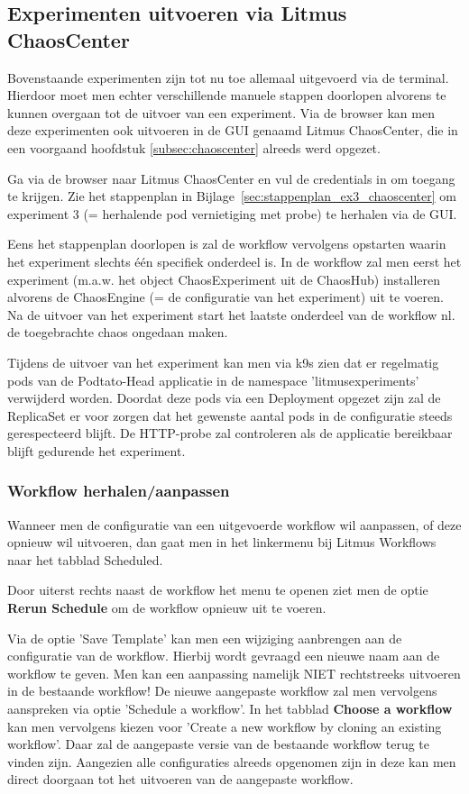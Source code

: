 \subsection{Experimenten uitvoeren via Litmus ChaosCenter}
\label{subsec:expchaoscenter}

Bovenstaande experimenten zijn tot nu toe allemaal uitgevoerd via de terminal. Hierdoor moet men echter verschillende manuele stappen doorlopen alvorens te kunnen overgaan tot de uitvoer van een experiment. Via de browser kan men deze experimenten ook uitvoeren in de GUI genaamd Litmus ChaosCenter, die in een voorgaand hoofdstuk \ref{subsec:chaoscenter} alreeds werd opgezet. 

Ga via de browser naar Litmus ChaosCenter en vul de credentials in om toegang te krijgen. Zie het  stappenplan in Bijlage~\ref{sec:stappenplan_ex3_chaoscenter} om experiment 3 (= herhalende pod vernietiging met probe) te herhalen via de GUI.

Eens het stappenplan doorlopen is zal de workflow vervolgens opstarten waarin het experiment slechts één specifiek onderdeel is. In de workflow zal men eerst het experiment (m.a.w. het object ChaosExperiment uit de ChaosHub) installeren alvorens de ChaosEngine (= de configuratie van het experiment) uit te voeren. Na de uitvoer van het experiment start het laatste onderdeel van de workflow nl. de toegebrachte chaos ongedaan maken.

Tijdens de uitvoer van het experiment kan men via k9s zien dat er regelmatig pods van de Podtato-Head applicatie in de namespace 'litmusexperiments' verwijderd worden. Doordat deze pods via een Deployment opgezet zijn zal de ReplicaSet er voor zorgen dat het gewenste aantal pods in de configuratie steeds gerespecteerd blijft. De HTTP-probe zal controleren als de applicatie bereikbaar blijft gedurende het experiment.
 
\subsubsection{Workflow herhalen/aanpassen}

Wanneer men de configuratie van een uitgevoerde workflow wil aanpassen, of deze opnieuw wil uitvoeren, dan gaat men in het linkermenu bij Litmus Workflows naar het tabblad Scheduled.

Door uiterst rechts naast de workflow het menu te openen ziet men de optie {\bf Rerun Schedule} om de workflow opnieuw uit te voeren.

Via de optie 'Save Template' kan men een wijziging aanbrengen aan de configuratie van de workflow. Hierbij wordt gevraagd een nieuwe naam aan de workflow te geven. Men kan een aanpassing namelijk NIET rechtstreeks uitvoeren in de bestaande workflow! De nieuwe aangepaste workflow zal men vervolgens aanspreken via optie 'Schedule a workflow'. In het tabblad {\bf Choose a workflow} kan men vervolgens kiezen voor 'Create a new workflow by cloning an existing workflow'. Daar zal de aangepaste versie van de bestaande workflow terug te vinden zijn. Aangezien alle configuraties alreeds opgenomen zijn in deze kan men direct doorgaan tot het uitvoeren van de aangepaste workflow. 

